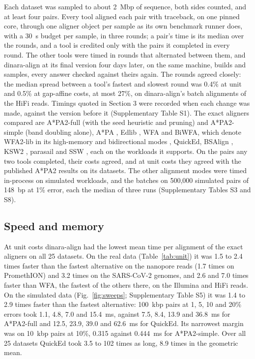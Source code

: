 Each dataset was sampled to about 2~Mbp of sequence, both sides counted, and at least four pairs. Every tool aligned each pair with traceback, on one pinned core, through one aligner object per sample as its own benchmark runner does, with a 30~s budget per sample, in three rounds; a pair's time is its median over the rounds, and a tool is credited only with the pairs it completed in every round. The other tools were timed in rounds that alternated between them, and dinara-align at its final version four days later, on the same machine, builds and samples, every answer checked against theirs again. The rounds agreed closely: the median spread between a tool's fastest and slowest round was 0.4\% at unit and 0.5\% at gap-affine costs, at most 27\%, on dinara-align's batch alignments of the HiFi reads. Timings quoted in Section 3 were recorded when each change was made, against the version before it (Supplementary Table S1). The exact aligners compared are A*PA2-full (with the seed heuristic and pruning) and A*PA2-simple (band doubling alone), A*PA \citep{GrootKoerkamp2024astarpa}, Edlib \citep{Sosic2017edlib}, WFA and BiWFA, which denote WFA2-lib in its high-memory and bidirectional modes \citep{MarcoSola2021wfa,MarcoSola2023biwfa}, QuickEd, BSAlign \citep{Shao2024bsalign}, KSW2 \citep{Li2018minimap2}, parasail \citep{Daily2016parasail} and SSW \citep{Zhao2013ssw}, each on the workloads it supports. On the pairs any two tools completed, their costs agreed, and at unit costs they agreed with the published A*PA2 results on its datasets. The other alignment modes were timed in-process on simulated workloads, and the batches on 500{,}000 simulated pairs of 148~bp at 1\% error, each the median of three runs (Supplementary Tables S3 and S8).

\subsection{Speed and memory}

At unit costs dinara-align had the lowest mean time per alignment of the exact aligners on all 25 datasets. On the real data (Table~\ref{tab:unit}) it was 1.5 to 2.4 times faster than the fastest alternative on the nanopore reads (1.7 times on PromethION) and 3.2 times on the SARS-CoV-2 genomes, and 2.6 and 7.0 times faster than WFA, the fastest of the others there, on the Illumina and HiFi reads. On the simulated data (Fig.~\ref{fig:sweeps}; Supplementary Table S5) it was 1.4 to 2.9 times faster than the fastest alternative: 100~kbp pairs at 1, 5, 10 and 20\% errors took 1.1, 4.8, 7.0 and 15.4~ms, against 7.5, 8.4, 13.9 and 36.8~ms for A*PA2-full and 12.5, 23.9, 39.0 and 62.6~ms for QuickEd. Its narrowest margin was on 10~kbp pairs at 10\%, 0.315 against 0.444~ms for A*PA2-simple. Over all 25 datasets QuickEd took 3.5 to 102 times as long, 8.9 times in the geometric mean.

